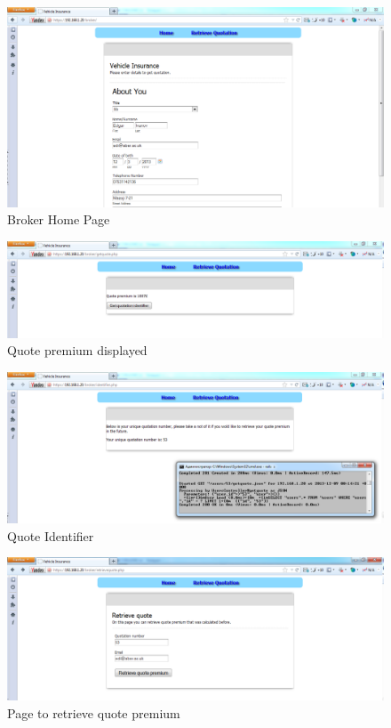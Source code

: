 \documentclass[10pt,a4paper,headinclude=true,twoside]{report}
\begin{document}
\begin{figure}[H]
\centering
\centerline{\includegraphics[scale=0.45]{./brokerMain}}
\caption{Broker Home Page}
\label{fig:brokerMain}
\end{figure} 

\begin{figure}[H]
\centering
\centerline{\includegraphics[scale=0.45]{./quotepremium}}
\caption{Quote premium displayed}
\label{fig:quotepremium}
\end{figure} 

\begin{figure}[H]
\centering
\centerline{\includegraphics[scale=0.45]{./QuotationNumber}}
\caption{Quote Identifier}
\label{fig:QuotationNumber}
\end{figure}

\begin{figure}[H]
\centering
\centerline{\includegraphics[scale=0.45]{./retrivequote}}
\caption{Page to retrieve quote premium}
\label{fig:retrivequote}
\end{figure} 
\end{document}
